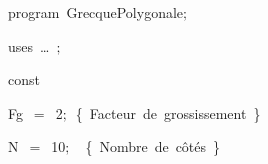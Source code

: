 
{
\parindent {}
\medskip

\carrenoir
\vspace{\neglskip}\mbox{\blc  \idt  \mcl program\idt \ GrecquePolygonale$;$
}\par 
\vspace{\neglskip}\mbox{\blc \blk\idt \mcl uses\idt \ \ldots\ $;$
}\par 
\pagebreak[3] 
\vspace{\neglskip}\mbox{\blc  \blk\idt  \mcl const\idt }\par 
\vspace{\neglskip}\mbox{\blc  \blk\blk\idt  Fg\ $=$\ 2$;$\ \cmt  \{\ Facteur\ de\ grossissement\ \}\idt }\par 
\vspace{\neglskip}\mbox{\blc  \blk\blk\idt  N\ $=$\ 10$;$\ \ \cmt  \{\ Nombre\ de\ côtés\ \}\idt }\par 
\medskip

}
